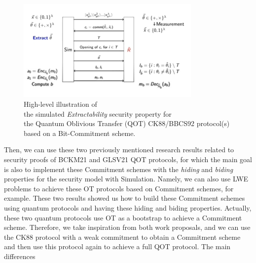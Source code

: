\documentclass[12pt]{article}
\begin{document}
   \begin{figure}[ht]
        \captionsetup{justification=centering}
        \centering
        \includegraphics[width=0.8\textwidth]{figures/images/img-14.pdf}
        \caption{High-level illustration of\\ the simulated \textit{Extractability} security property for\\ the Quantum Oblivious Transfer (QOT) CK88/BBCS92 protocol(s)\\ based on a Bit-Commitment scheme.}
        \label{fig:simulated-extractability-security-property-quantum-oblivious-transfer-ck88-bbcs92-protocols-based-bit-commitment-scheme}
    \end{figure}

    \noindent Then, we can use these two previously mentioned research results related to security proofs of BCKM21 \cite{bartusek-coladangelo-khurana-ma:one-way-functions-imply-secure-computation-quantum-world:2020:03-2024} and GLSV21 \cite{grilo-lin-song-vaikuntanathan:oblivious-transfer-miniqcrypt:2020:03-2024} QOT protocols, for which the main goal is also to implement these Commitment schemes with the \textit{hiding} and \textit{biding} properties for the security model with Simulation. Namely, we can also use LWE problems to achieve these OT protocols based on Commitment schemes, for example. These two results showed us how to build these Commitment schemes using quantum protocols and having these hiding and biding properties. Actually, these two quantum protocols use OT as a bootstrap to achieve a Commitment scheme. Therefore, we take inspiration from both work proposals, and we can use the CK88 protocol \cite{crepeau-kilian:achieving-oblivious-transfer-using-weakened-security-assumptions:1988:03-2024,crepeau-kilian:weakening-security-assumptions-and-oblivious-transfer:1988:03-2024} with a weak commitment to obtain a Commitment scheme and then use this protocol again to achieve a full QOT protocol. The main differences
\end{document}

